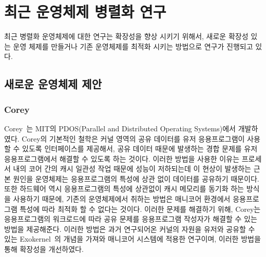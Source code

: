 
\newpage
\section{최근 운영체제 병렬화 연구}
\label{sec:osrelated}


최근 병렬화 운영체제에 대한 연구는 확장성을 향상 시키기 위해서, 새로운 확장성 있는
운영 체제를 만들거나  
기존 운영체제를 최적화 시키는 방법으로 연구가 진행되고 있다.


\subsection{새로운 운영체제 제안}

\subsubsection{Corey}
Corey~\cite{Boyd-WickizerCorey}는 MIT의 PDOS(Parallel and Distributed Operating
Systems)에서 개발하였다.
Corey의 기본적인 철학은 커널 영역의 공유 데이터를 유저 응용프로그램이 사용할 수 있도록 인터페이스를 제공해서,
공유 데이터 때문에 발생하는 경합 문제를 유저 응용프로그램에서 해결할 수 있도록 하는 것이다.
이러한 방법을 사용한 이유는 프로세서 내의 코어 간의 캐시 일관성 작업 때문에 성능이 저하되는데 
이 현상이 발생하는 근본 원인을 운영체제는 응용프로그램의 특성에 상관 없이 데이터를 공유하기 때문이다.
또한 하드웨어 역시 응용프로그램의 특성에 상관없이 캐시 메모리를 동기화 하는 방식을 사용하기 때문에,
기존의 운영체제에서 취하는 방법은 매니코어 환경에서 응용프로그램 특성에 따라 최적화 할 수 없다는 것이다.
이러한 문제를 해결하기 위해, Corey는 응용프로그램의 워크로드에 따라 공유 문제를 응용프로그램 작성자가 
해결할 수 있는 방법을 제공해준다.
이러한 방법은 과거 연구되어온 커널의 자원을 유저와 공유할 수 있는 Exokernel~\cite{Engler1995EOS}의 개념을 가져와 
매니코어 시스템에 적용한 연구이며, 이러한 방법을 통해 확장성을 개선하였다.

